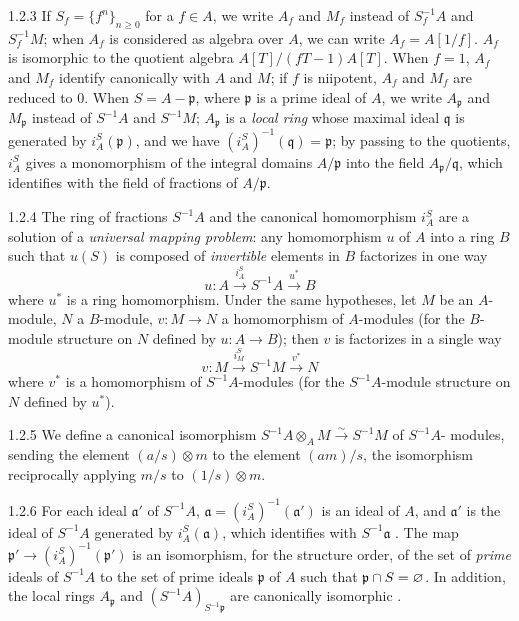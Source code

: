 \documentclass{book}
\begin{document}
\begin{env}{1.2.3}
\label{env-0.1.2.3}
If $S_f=\{f^n\}_{n\geq 0}$ for a $f\in A$, we write $A_f$ and $M_f$ instead of $S_f^{-1}A$ and $S_f^{-1}M$; when $A_f$ is
considered as algebra over $A$, we can write $A_f=A[1/f]$. $A_f$ is isomorphic to the quotient algebra $A[T]/(fT-1)A[T]$.
When $f=1$, $A_f$ and $M_f$ identify canonically with $A$ and $M$; if $f$ is niipotent, $A_f$ and $M_f$ are reduced to $0$.
When $S=A-\mathfrak{p}$, where $\mathfrak{p}$ is a prime ideal of $A$, we write $A_\mathfrak{p}$ and $M_\mathfrak{p}$ instead of $S^{-1}A$ and $S^{-1}M$;
$A_\mathfrak{p}$ is a \emph{local ring} whose maximal ideal $\mathfrak{q}$ is generated by $i_A^S(\mathfrak{p})$, and we have
$(i_A^S)^{-1}(\mathfrak{q})=\mathfrak{p}$; by passing to the quotients, $i_A^S$ gives a monomorphism of the integral domains $A/\mathfrak{p}$ into the
field $A_\mathfrak{p}/\mathfrak{q}$, which identifies with the field of fractions of $A/\mathfrak{p}$.
\end{env}

\begin{env}{1.2.4}
\label{env-0.1.2.4}
The ring of fractions $S^{-1}A$ and the canonical homomorphism $i_A^S$ are a solution of a \emph{universal mapping problem}:
any homomorphism $u$ of $A$ into a ring $B$ such that $u(S)$ is composed of \emph{invertible} elements in $B$ factorizes in
one way
\[
  u\colon A\xrightarrow{i_A^S}S^{-1}A\xrightarrow{u^\ast}B
\]
where $u^\ast$ is a ring homomorphism. Under the same hypotheses, let $M$ be an
$A$-module, $N$ a $B$-module, $v\colon M\to N$ a homomorphism of $A$-modules (for the
$B$-module structure on $N$ defined by $u\colon A\to B$); then $v$ is factorizes in a single
way
\[
  v\colon M\xrightarrow{i_M^S}S^{-1}M\xrightarrow{v^\ast}N
\]
where $v^\ast$ is a homomorphism of $S^{-1}A$-modules (for the $S^{-1}A$-module structure 
on $N$ defined by $u^\ast$).
\end{env}

\begin{env}{1.2.5}
\label{env-0.1.2.5}
We define a canonical isomorphism $S^{-1}A\otimes_A M\xrightarrow{\sim}S^{-1}M$ of $S^{-1}A$-
modules, sending the element $(a/s)\otimes m$ to the element $(am)/s$, the isomorphism
reciprocally applying $m/s$ to $(1/s)\otimes m$.
\end{env}

\begin{env}{1.2.6}
\label{env-0.1.2.6}
For each ideal $\mathfrak{a}'$ of $S^{-1}A$, $\mathfrak{a}=(i_A^S)^{-1}(\mathfrak{a}')$ is an ideal of $A$, and $\mathfrak{a}'$
is the ideal of $S^{-1}A$ generated by $i_A^S(\mathfrak{a})$, which identifies with $S^{-1}\mathfrak{a}$ . The map
$\mathfrak{p}'\to(i_A^S)^{-1}(\mathfrak{p}')$ is an isomorphism, for the structure order, of the set of \emph{prime} ideals
of $S^{-1}A$ to the set of prime ideals $\mathfrak{p}$ of $A$ such that $\mathfrak{p}\cap S=\varnothing$. In addition, the local rings
$A_{\mathfrak{p}}$ and $(S^{-1}A)_{S^{-1}\mathfrak{p}}$ are canonically isomorphic .
\end{env}
\end{document}
